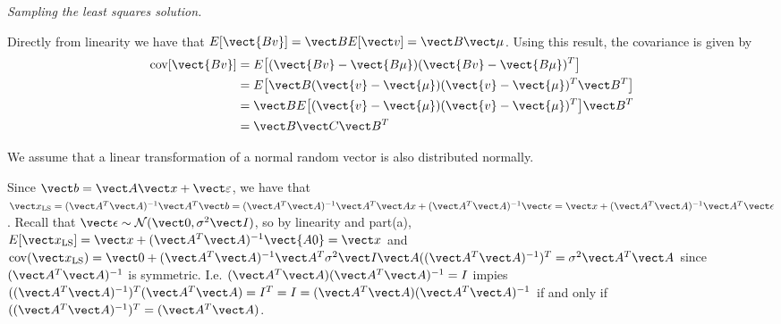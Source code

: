 \documentclass{homework}
\begin{document}
\begin{longproblem}
\emph{Sampling the least squares solution. }


\begin{solution}
  Directly from linearity we have that $E[ \vect{Bv} ]= \vect B E[\vect v] = \vect B \vect \mu$.  Using this result, the covariance is given by 
  \begin{align*}
  \mathrm{cov}[\vect{Bv}] &= E\big[ (\vect{Bv} - \vect {B\mu})(\vect{Bv} -\vect {B\mu})^T\big]\\
  &= E\big[ \vect B(\vect{v} - \vect {\mu})(\vect{v} -\vect {\mu})^T\vect B^T\big]\\
  &= \vect BE\big[ (\vect{v} - \vect {\mu})(\vect{v} -\vect {\mu})^T\big]\vect B^T\\
  &= \vect B\vect C\vect B^T\\
  \end{align*}
\end{solution}


\begin{solution}
  We assume that a linear transformation of a normal random vector is also distributed normally.  

  Since $\vect b = \vect A\vect x + \vect \eps$, we have that $\vect
  x_{\mathrm{LS}} = (\vect A^T \vect A)^{-1} \vect A^T \vect b = (\vect A^T
  \vect A)^{-1} \vect A^T\vect A x + (\vect A^T \vect A)^{-1} \vect \epsilon =
  \vect x + (\vect A^T \vect A)^{-1} \vect A^T \vect \epsilon$.  Recall that $\vect
  \epsilon \sim \mathcal N(\vect 0,\sigma^2 \vect I)$, so by linearity and
  part\nobreak(a), $E[\vect x_{\mathrm{LS}}] = \vect x + (\vect A^T \vect
  A)^{-1}\vect {A0} = \vect x$ and $\mathrm{cov}(\vect x_{\mathrm{LS}}) = \vect 0
  + (\vect A^T \vect A)^{-1}\vect A^T \sigma^2 \vect I \vect A ((\vect A^T \vect A)^{-1})^T = \sigma^2 \vect A^T \vect A$ since $(\vect A^T \vect A)^{-1}$ is symmetric.  I.e. $(\vect A^T \vect A) (\vect A^T \vect A)^{-1} = I$ impies $((\vect A^T \vect A)^{-1})^T (\vect A^T \vect A) = I^T = I = (\vect A^T \vect A) (\vect A^T \vect A)^{-1}$ if and only if $((\vect A^T \vect A)^{-1})^T = (\vect A^T \vect A)$.
  \end{solution}


\end{longproblem}
\end{document}
